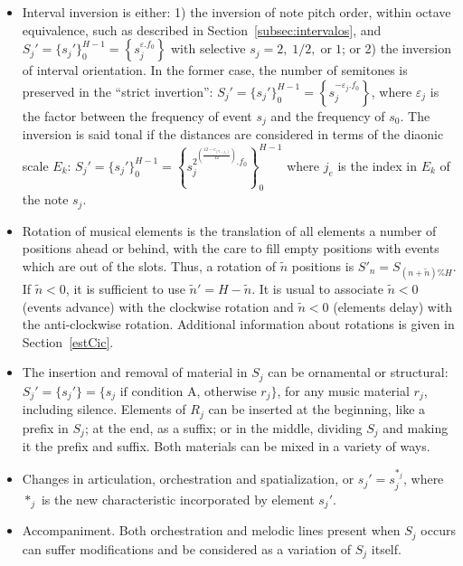 \begin{itemize}
        \item Interval inversion is either: 1) the inversion of note pitch order, within octave equivalence, such as described in Section~\ref{subsec:intervalos}, and $S_j'=\{s_j'\}_0^{H-1}=\left\{s_j^{\varepsilon. f_0}\right\}$ with selective $s_j=2,\;1/2,\;\text{or}\;1$; or 2) the inversion of interval orientation. In the former case, the number of semitones
        is preserved in the ``strict invertion'':
        $S_j'=\{s_j'\}_0^{H-1}=\left\{s_j^{-\varepsilon_j . f_0}\right\}$, where
        $\varepsilon_j$ is the factor between the frequency of event $s_j$ and the
        frequency of $s_0$. The inversion is said tonal if the distances are
        considered in terms of the diaonic scale $E_k$:
        $S_j'=\{s_j'\}_0^{H-1}=\left\{s_j^{2^{\left(\frac{12-e_{\left(7-j_e\right)}}{12}\right)}
        . f_0}\right\}_0^{H-1}$ where $j_e$ is the index in
        $E_k$ of the note $s_j$.

        \item Rotation of musical elements is the translation of all elements
        a number of positions ahead or behind, with the care to fill empty positions
        with events which are out of the slots. Thus, a
        rotation of $\tilde{n}$ positions is $S'_n=S_{(n+\tilde{n})\%H}$. If
        $\tilde{n}<0$, it is sufficient to use $\tilde{n}'=H-\tilde{n}$. It is
        usual to associate $\tilde{n}<0$ (events advance) with the clockwise rotation and
        $\tilde{n}<0$ (elements delay) with the anti-clockwise rotation.
        Additional information about rotations is given in Section~\ref{estCic}.

        \item The insertion and removal of material in $S_j$ can be
    ornamental or structural: $S_j'=\{s_j'\}=\{s_j \text{ if condition A,
    otherwise } r_j\}$, for any music material $r_j$, including silence.
    Elements of $R_j$ can be inserted at the beginning, like a prefix
    in $S_j$; at the end, as a suffix; or in the middle, dividing $S_j$ and making
    it the prefix and suffix. Both materials can be mixed in a variety of ways.

    \item Changes in articulation, orchestration and spatialization, or
    $s_j'=s_j^{*_j}$, where $*_j$ is the new characteristic incorporated by 
    element $s_j'$.
    
    \item Accompaniment. Both orchestration and melodic lines present when $S_j$ occurs can suffer modifications and be considered as a variation of $S_j$ itself.
\end{itemize}

